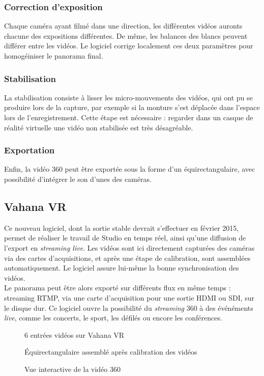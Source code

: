 \subsubsection{Correction d'exposition}
Chaque caméra ayant filmé dans une direction, les différentes vidéos auronts chacune 
des expositions différentes. De même, les balances des blancs peuvent différer
entre les vidéos. Le logiciel corrige localement ces deux paramètres pour homogéiniser
le panorama final.

\subsubsection{Stabilisation}
La stabilisation consiste à  lisser les micro-mouvements des vidéos, qui ont 
pu se produire lors de la capture, par exemple si la monture s'est déplacée dans l'espace lors
de l'enregistrement. Cette étape est nécessaire : regarder dans un casque de réalité
virtuelle une vidéo non stabilisée est très désagréable.

\subsubsection{Exportation}
Enfin, la vidéo 360 peut être exportée sous la forme d'un équirectangulaire, avec
possibilité d'intégrer le son d'unes des caméras.

\subsection{Vahana VR}
Ce nouveau logiciel, dont la sortie stable devrait s'effectuer en février 2015,
permet de réaliser le travail de Studio en temps réel, ainsi qu'une diffusion
de l'export en \textit{streaming live}. Les vidéos sont ici directement capturées des
caméras via des cartes d'acquisitions, et après une étape de calibration, sont
assemblées automatiquement. Le logiciel assure lui-même la bonne synchronisation
des vidéos.\\
Le panorama peut être alors exporté sur différents flux en même temps : 
streaming RTMP, via une carte d'acquisition pour une sortie HDMI ou SDI, sur le
disque dur. Ce logiciel ouvre la possibilité du \textit{streaming} 360 à des événéments 
\textit{live}, comme les concerts, le sport, les défilés ou encore les conférences.
\begin{figure}
  \centering
  \begin{minipage}{0.3\textwidth}
    \centering
    \caption{6 entrées vidéos sur Vahana VR}
  \end{minipage}%
  \begin{minipage}{0.3\textwidth}
    \centering
    \caption{Équirectangulaire assemblé après calibration des vidéos}
  \end{minipage}
  \begin{minipage}{0.3\textwidth}
    \centering
    \caption{Vue interactive de la vidéo 360}
  \end{minipage}
\end{figure}


